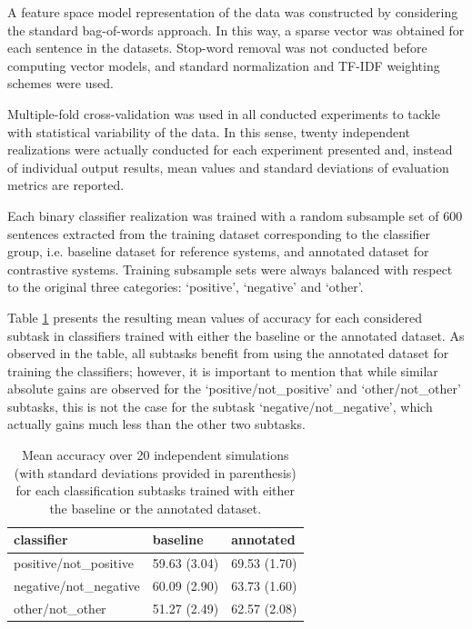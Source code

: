 \documentclass[11pt, a4paper,onecolumn]{article}
\begin{document}
A feature space model representation of the data was constructed by considering the standard bag-of-words approach. 
In this way, a sparse vector was obtained for each sentence in the datasets. Stop-word removal was not
conducted before computing vector models, and standard normalization and TF-IDF weighting schemes were used.

Multiple-fold cross-validation was used in all conducted experiments to tackle with statistical variability of the 
data. In this sense, twenty independent realizations were actually conducted for each experiment presented and,
instead of individual output results, mean values and standard deviations of evaluation metrics are reported.

Each binary classifier realization was trained with a random subsample set of 600 sentences extracted from 
the training dataset corresponding to the classifier group, i.e. baseline dataset for reference systems, 
and annotated dataset for contrastive systems. Training subsample sets were always balanced with respect to 
the original three categories: `positive', `negative' and `other'.


Table \ref{table:tc_accu} presents the resulting mean values of accuracy for each considered subtask 
in classifiers trained with either the baseline or the annotated dataset. As observed in the table,
all subtasks benefit from using the annotated dataset for training the classifiers; however, it is 
important to mention that while similar absolute gains are observed for the `positive/not\_positive' 
and `other/not\_other' subtasks, this is not the case for the subtask `negative/not\_negative', 
which actually gains much less than the other two subtasks.

\begin{table}
\begin{center}
\begin{small}
\begin{tabular}{|l|l|l|}
\hline
classifier &baseline &annotated \\ 
\hline
positive/not\_positive &59.63 (3.04) &69.53 (1.70) \\ 
\hline
negative/not\_negative &60.09 (2.90) &63.73 (1.60) \\ 
\hline
other/not\_other &51.27 (2.49) &62.57 (2.08) \\ 
\hline
\end{tabular}
\end{small}
\caption{Mean accuracy over 20 independent simulations (with standard deviations provided in parenthesis) 
for each classification subtasks trained with either the baseline or the annotated dataset.}
\label{table:tc_accu}
\end{center}
\end{table}
\end{document}
